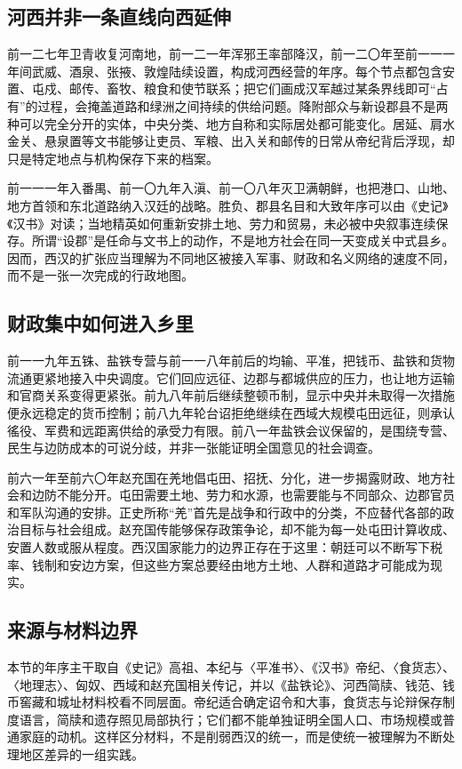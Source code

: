 \subsection{河西并非一条直线向西延伸}

前一二七年卫青收复河南地，前一二一年浑邪王率部降汉，前一二〇年至前一一一年间武威、酒泉、张掖、敦煌陆续设置，构成河西经营的年序。每个节点都包含安置、屯戍、邮传、畜牧、粮食和使节联系；把它们画成汉军越过某条界线即可“占有”的过程，会掩盖道路和绿洲之间持续的供给问题。降附部众与新设郡县不是两种可以完全分开的实体，中央分类、地方自称和实际居处都可能变化。居延、肩水金关、悬泉置等文书能够让吏员、军粮、出入关和邮传的日常从帝纪背后浮现，却只是特定地点与机构保存下来的档案。

前一一一年入番禺、前一〇九年入滇、前一〇八年灭卫满朝鲜，也把港口、山地、地方首领和东北道路纳入汉廷的战略。胜负、郡县名目和大致年序可以由《史记》《汉书》对读；当地精英如何重新安排土地、劳力和贸易，未必被中央叙事连续保存。所谓“设郡”是任命与文书上的动作，不是地方社会在同一天变成关中式县乡。因而，西汉的扩张应当理解为不同地区被接入军事、财政和名义网络的速度不同，而不是一张一次完成的行政地图。

\subsection{财政集中如何进入乡里}

前一一九年五铢、盐铁专营与前一一八年前后的均输、平准，把钱币、盐铁和货物流通更紧地接入中央调度。它们回应远征、边郡与都城供应的压力，也让地方运输和官商关系变得更紧张。前九八年前后继续整顿币制，显示中央并未取得一次措施便永远稳定的货币控制；前八九年轮台诏拒绝继续在西域大规模屯田远征，则承认徭役、军费和远距离供给的承受力有限。前八一年盐铁会议保留的，是围绕专营、民生与边防成本的可说分歧，并非一张能证明全国意见的社会调查。

前六一年至前六〇年赵充国在羌地倡屯田、招抚、分化，进一步揭露财政、地方社会和边防不能分开。屯田需要土地、劳力和水源，也需要能与不同部众、边郡官员和军队沟通的安排。正史所称“羌”首先是战争和行政中的分类，不应替代各部的政治目标与社会组成。赵充国传能够保存政策争论，却不能为每一处屯田计算收成、安置人数或服从程度。西汉国家能力的边界正存在于这里：朝廷可以不断写下税率、钱制和安边方案，但这些方案总要经由地方土地、人群和道路才可能成为现实。

\subsection{来源与材料边界}

本节的年序主干取自《史记》高祖、本纪与〈平准书〉、《汉书》帝纪、〈食货志〉、〈地理志〉、匈奴、西域和赵充国相关传记，并以《盐铁论》、河西简牍、钱范、钱币窖藏和城址材料校看不同层面。帝纪适合确定诏令和大事，食货志与论辩保存制度语言，简牍和遗存照见局部执行；它们都不能单独证明全国人口、市场规模或普通家庭的动机。这样区分材料，不是削弱西汉的统一，而是使统一被理解为不断处理地区差异的一组实践。
